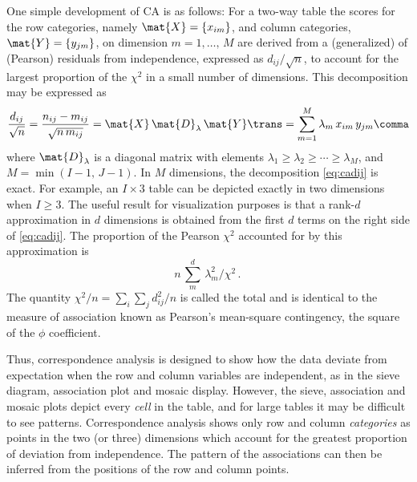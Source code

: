 \documentclass[11pt]{book}\usepackage[]{graphicx}\usepackage[]{color}
\begin{document}
One simple development of CA is as follows:
For a two-way table the scores for the row categories, namely
\(\mat{X} = \{x_{im}\}\), and column categories, \(\mat{Y} = \{y_{jm}\}\), on dimension \(m = 1,
\dots , \,  M\) are derived from a (generalized)  of
(Pearson) residuals from independence, expressed as \(d_{ij} /  \sqrt n\), to
account for the largest proportion of the \(\chi^2\) in a small
number of dimensions.  This decomposition may be expressed as
%
\begin{equation} \label{eq:cadij}
  \frac{d_{ij}}{\sqrt{n}} = 
  \frac{n_{ij} - m_{ij}} {\sqrt {n \,  m_{ij}}} =
  \mat{X} \, \mat{D}_\lambda \, \mat{Y}\trans =
  \sum_{m=1}^M  \lambda_m \,  x_{im} \,  y_{jm}
  \comma
\end{equation}
where $\mat{D}_\lambda$ is a diagonal matrix with elements
\(\lambda_1 \geq \lambda_2 \geq \cdots \geq \lambda_M\), and \(M
=  \min ( I-1 , \,  J-1 )\).  In \(M\) dimensions, the decomposition
\eqref{eq:cadij} is exact.
For example, an \(I \times 3\) table can be depicted exactly
in two dimensions when $I \ge 3$.  The useful result for visualization
purposes is that
a rank-\(d\) approximation in \(d\) dimensions is
obtained from the first \(d\) terms on the right side of \eqref{eq:cadij}.
The proportion of the Pearson \(\chi^2\) accounted for by this approximation is
\begin{equation*}
 n \,  \sum_m^d { \,  \lambda_m^2 } \big/  \chi^2
 \period
\end{equation*}
The quantity $\chi^2 /n = \sum_i \sum_j d_{ij}^2  / n$ is called
the total  and is identical to the measure of
association known as Pearson's mean-square contingency, the
square of the $\phi$ coefficient.

Thus, correspondence analysis is designed to show how the data
deviate from expectation when the row and column variables are
independent, as in the sieve diagram, 
association plot and mosaic display.  However,
the sieve, association and mosaic plots depict every \emph{cell} in
the table, and for large tables it may be difficult to see patterns.
Correspondence analysis shows only row and column \emph{categories} 
as points in
the two (or three) dimensions which account for the greatest
proportion of deviation from independence.
The pattern of the associations can then be inferred from the positions of the
row and column points.
\end{document}
